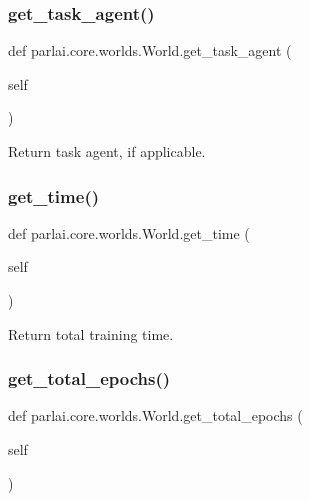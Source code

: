 \subsubsection{\texorpdfstring{get\+\_\+task\+\_\+agent()}{get\_task\_agent()}}
{\footnotesize\ttfamily def parlai.\+core.\+worlds.\+World.\+get\+\_\+task\+\_\+agent (\begin{DoxyParamCaption}\item[{}]{self }\end{DoxyParamCaption})}

\begin{DoxyVerb}Return task agent, if applicable.
\end{DoxyVerb}
 \mbox{\label{classparlai_1_1core_1_1worlds_1_1World_a621ed405ee96d67bc4bab781145a3daa}} 
\subsubsection{\texorpdfstring{get\+\_\+time()}{get\_time()}}
{\footnotesize\ttfamily def parlai.\+core.\+worlds.\+World.\+get\+\_\+time (\begin{DoxyParamCaption}\item[{}]{self }\end{DoxyParamCaption})}

\begin{DoxyVerb}Return total training time.
\end{DoxyVerb}
 \mbox{\label{classparlai_1_1core_1_1worlds_1_1World_acf90b0f1a9ec1314b905159559b4d4ab}} 
\subsubsection{\texorpdfstring{get\+\_\+total\+\_\+epochs()}{get\_total\_epochs()}}
{\footnotesize\ttfamily def parlai.\+core.\+worlds.\+World.\+get\+\_\+total\+\_\+epochs (\begin{DoxyParamCaption}\item[{}]{self }\end{DoxyParamCaption})}

